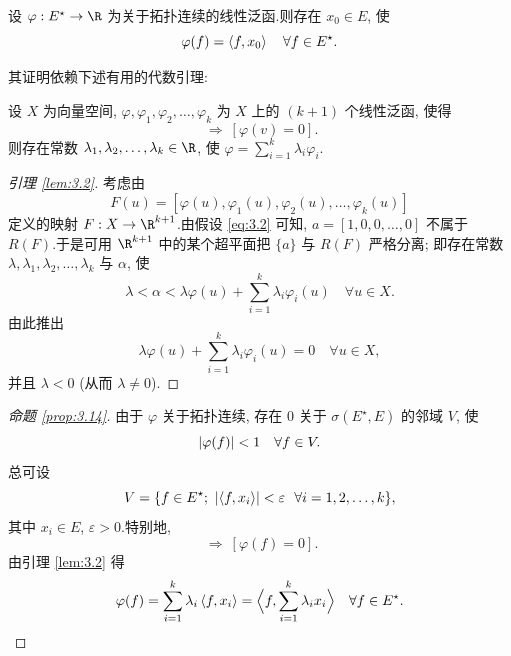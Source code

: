 \begin{starproposition}
\label{prop:3.14}
设 $\varphi:E^\star\to\R$ 为关于\wstar{}拓扑连续的线性泛函.则存在 $x_0\in E$,
使
\begin{equation*}
\varphi(f)=\left\langle f,x_0\right\rangle\quad\forall f\in E^\star.
\end{equation*}
\end{starproposition}

其证明依赖下述有用的代数引理:

\begin{lemma}
\label{lem:3.2}
设 $X$ 为向量空间, $\varphi,\varphi_1,\varphi_2,\dots,\varphi_k$ 为 $X$ 上的
$(k+1)$ 个线性泛函, 使得
\begin{equation}
[\varphi_i(v)=0\ \ \forall i=1,2,\dots,k]\ \Rightarrow\ [\varphi(v)=0].
\label{eq:3.2}
\end{equation}
则存在常数 $\lambda_1,\lambda_2,\dots,\lambda_k\in\R$, 使
$\varphi=\sum_{i=1}^k\lambda_i\varphi_i$.
\end{lemma}


\begin{proof}[引理 \ref{lem:3.2}]
考虑由
\begin{equation*}
F(u)=[\varphi(u),\varphi_1(u),\varphi_2(u),\dots,\varphi_k(u)]
\end{equation*}
定义的映射 $F:X\to\R^{k+1}$.由假设 \eqref{eq:3.2} 可知,
$a=[1,0,0,\dots,0]$ 不属于 $R(F)$.于是可用 $\R^{k+1}$ 中的某个超平面把
$\{a\}$ 与 $R(F)$ 严格分离; 即存在常数
$\lambda,\lambda_1,\lambda_2,\dots,\lambda_k$ 与 $\alpha$, 使
\begin{equation*}
\lambda<\alpha<\lambda\varphi(u)+\sum_{i=1}^k\lambda_i\varphi_i(u)
\quad\forall u\in X.
\end{equation*}
由此推出
\begin{equation*}
\lambda\varphi(u)+\sum_{i=1}^k\lambda_i\varphi_i(u)=0\quad\forall u\in X,
\end{equation*}
并且 $\lambda<0$ (从而 $\lambda\ne0$).
\end{proof}

\begin{proof}[命题 \ref{prop:3.14}]
由于 $\varphi$ 关于\wstar{}拓扑连续, 存在 $0$ 关于 $\sigma(E^\star,E)$ 的邻域
$V$, 使
\begin{equation*}
\left|\varphi(f)\right|<1\quad\forall f\in V.
\end{equation*}
总可设
\begin{equation*}
V=\{f\in E^\star;\ \abs{\dual{f}{x_i}}<\varepsilon\ \ \forall i=1,2,\dots,k\},
\end{equation*}
其中 $x_i\in E$, $\varepsilon>0$.特别地,
\begin{equation*}
[\dual{f}{x_i}=0\ \ \forall i=1,2,\dots,k]\ \Rightarrow\ [\varphi(f)=0].
\end{equation*}
由引理  \ref{lem:3.2} 得
\begin{equation*}
\varphi(f)=\sum_{i=1}^k\lambda_i\left\langle f,x_i\right\rangle
=\Bigl\langle f,\sum_{i=1}^k\lambda_ix_i\Bigr\rangle\quad\forall f\in E^\star.
\end{equation*}
\end{proof}

